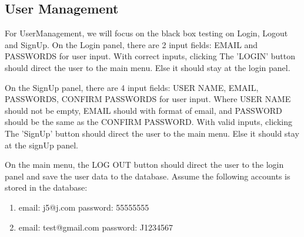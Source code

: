 \documentclass[11pt]{article}
\begin{document}
    \subsection{User Management}

    For UserManagement, we will focus on the black box testing on Login, Logout and SignUp.
    On the Login panel, there are 2 input fields: EMAIL and PASSWORDS for user input.
    With correct inputs, clicking The 'LOGIN' button should direct the user to the main menu. Else it should stay at the login panel.

    On the SignUp panel, there are 4 input fields: USER NAME, EMAIL, PASSWORDS, CONFIRM PASSWORDS for user input.
    Where USER NAME should not be empty, EMAIL should with format of email, and PASSWORD should be the same as the CONFIRM PASSWORD.
    With valid inputs, clicking The 'SignUp' button should direct the user to the main menu. Else it should stay at the signUp panel.

    On the main menu, the LOG OUT button should direct the user to the login panel and save the user data to the database.
    Assume the following accounts is stored in the database:
    \begin{enumerate}
        \item email: j5@j.com password: 55555555
        \item email: test@gmail.com password: J1234567
    \end{enumerate}
\end{document}
